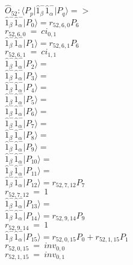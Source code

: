 \documentclass[14pt]{article}
\begin{document}
    $\hat{O}_{52}:  \langle{P_p}\vert \hat{1}_{\beta}^{-}\hat{1}_{\alpha}^{-} \vert{P_q}\rangle => $ \\ 
    $ \hat{1}_{\beta}^{-}\hat{1}_{\alpha}^{-} \vert{P_{0}}\rangle = {r}_{52,6,0}P_{6} $ \\ 
    ${r}_{52,6,0}\ =\ {ci}_{0,1} $ \\ 
    $ \hat{1}_{\beta}^{-}\hat{1}_{\alpha}^{-} \vert{P_{1}}\rangle = {r}_{52,6,1}P_{6} $ \\ 
    ${r}_{52,6,1}\ =\ {ci}_{1,1} $ \\ 
    $ \hat{1}_{\beta}^{-}\hat{1}_{\alpha}^{-} \vert{P_{2}}\rangle =  $ \\ 
    $ \hat{1}_{\beta}^{-}\hat{1}_{\alpha}^{-} \vert{P_{3}}\rangle =  $ \\ 
    $ \hat{1}_{\beta}^{-}\hat{1}_{\alpha}^{-} \vert{P_{4}}\rangle =  $ \\ 
    $ \hat{1}_{\beta}^{-}\hat{1}_{\alpha}^{-} \vert{P_{5}}\rangle =  $ \\ 
    $ \hat{1}_{\beta}^{-}\hat{1}_{\alpha}^{-} \vert{P_{6}}\rangle =  $ \\ 
    $ \hat{1}_{\beta}^{-}\hat{1}_{\alpha}^{-} \vert{P_{7}}\rangle =  $ \\ 
    $ \hat{1}_{\beta}^{-}\hat{1}_{\alpha}^{-} \vert{P_{8}}\rangle =  $ \\ 
    $ \hat{1}_{\beta}^{-}\hat{1}_{\alpha}^{-} \vert{P_{9}}\rangle =  $ \\ 
    $ \hat{1}_{\beta}^{-}\hat{1}_{\alpha}^{-} \vert{P_{10}}\rangle =  $ \\ 
    $ \hat{1}_{\beta}^{-}\hat{1}_{\alpha}^{-} \vert{P_{11}}\rangle =  $ \\ 
    $ \hat{1}_{\beta}^{-}\hat{1}_{\alpha}^{-} \vert{P_{12}}\rangle = {r}_{52,7,12}P_{7} $ \\ 
    ${r}_{52,7,12}\ =\ 1 $ \\ 
    $ \hat{1}_{\beta}^{-}\hat{1}_{\alpha}^{-} \vert{P_{13}}\rangle =  $ \\ 
    $ \hat{1}_{\beta}^{-}\hat{1}_{\alpha}^{-} \vert{P_{14}}\rangle = {r}_{52,9,14}P_{9} $ \\ 
    ${r}_{52,9,14}\ =\ 1 $ \\ 
    $ \hat{1}_{\beta}^{-}\hat{1}_{\alpha}^{-} \vert{P_{15}}\rangle = {r}_{52,0,15}P_{0}+{r}_{52,1,15}P_{1} $ \\ 
    ${r}_{52,0,15}\ =\ {inv}_{0,0} $ \\ 
    ${r}_{52,1,15}\ =\ {inv}_{0,1} $ \\ 
    
\end{document}

